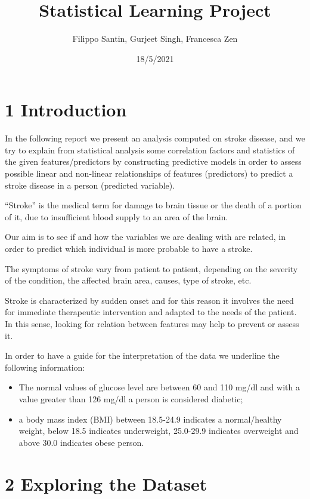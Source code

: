\documentclass[
]{article}
\title{Statistical Learning Project}
\author{Filippo Santin, Gurjeet Singh, Francesca Zen}
\date{18/5/2021}
\providecommand{\tightlist}{%
  \setlength{\itemsep}{0pt}\setlength{\parskip}{0pt}}
\begin{document}
\maketitle

\hypertarget{introduction}{%
\section{1 Introduction}\label{introduction}}

In the following report we present an analysis computed on stroke
disease, and we try to explain from statistical analysis some
correlation factors and statistics of the given features/predictors by
constructing predictive models in order to assess possible linear and
non-linear relationships of features (predictors) to predict a stroke
disease in a person (predicted variable).

``Stroke'' is the medical term for damage to brain tissue or the death
of a portion of it, due to insufficient blood supply to an area of the
brain.

Our aim is to see if and how the variables we are dealing with are
related, in order to predict which individual is more probable to have a
stroke.

The symptoms of stroke vary from patient to patient, depending on the
severity of the condition, the affected brain area, causes, type of
stroke, etc.

Stroke is characterized by sudden onset and for this reason it involves
the need for immediate therapeutic intervention and adapted to the needs
of the patient. In this sense, looking for relation between features may
help to prevent or assess it.

In order to have a guide for the interpretation of the data we underline
the following information:

\begin{itemize}
\tightlist
\item
  The normal values of glucose level are between 60 and 110 mg/dl and
  with a value greater than 126 mg/dl a person is considered diabetic;
\item
  a body mass index (BMI) between 18.5-24.9 indicates a normal/healthy
  weight, below 18.5 indicates underweight, 25.0-29.9 indicates
  overweight and above 30.0 indicates obese person.
\end{itemize}

\hypertarget{exploring-the-dataset}{%
\section{2 Exploring the Dataset}\label{exploring-the-dataset}}
\end{document}
